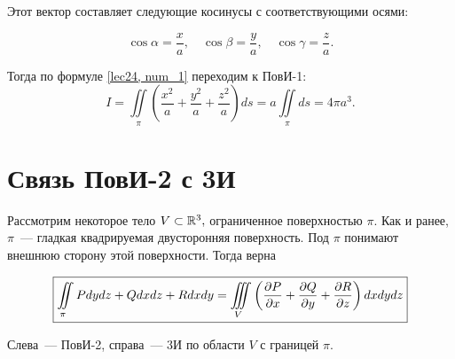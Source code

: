 \documentclass[../../main.tex]{subfiles}
\begin{document}
\begin{example}
	Этот вектор составляет следующие косинусы с соответствующими осями:
	
	\[\cos\alpha=\frac{x}{a},\quad \cos\beta=\frac{y}{a},\quad \cos\gamma=
	\frac{z}{a}.\]
	
	 Тогда по формуле \eqref{lec24, num_1} переходим к ПовИ-1:
	\[I=\iint\limits_\pi\left(\frac{x^2}{a} + \frac{y^2}{a} +
	 \frac{z^2}{a}\right)ds = a \iint\limits_\pi ds = 4\pi a^3.\]
\end{example}

\section{Связь ПовИ-2 с 3И}

Рассмотрим некоторое тело $V\subset \mathbb{R}^3,$ ограниченное поверхностью $\pi.$ 
Как и ранее, $\pi$~--- гладкая квадрируемая двусторонняя поверхность. 
Под $\pi$ понимают внешнюю сторону этой поверхности. Тогда верна

\begin{thm}
\begin{equation}\label{lec24, num_3}
\boxed{\iint\limits_\pi Pdydz +  Qdxdz + Rdxdy = \iiint\limits_V \left(\frac{\partial P}{\partial x}
  + \frac{\partial Q}{\partial y} + \frac{\partial R}{\partial z}\right) dxdydz}\end{equation}
  
   Слева~--- ПовИ-2, справа~--- 3И по области $V$ с границей $\pi$.
\end{thm}
\end{document}
